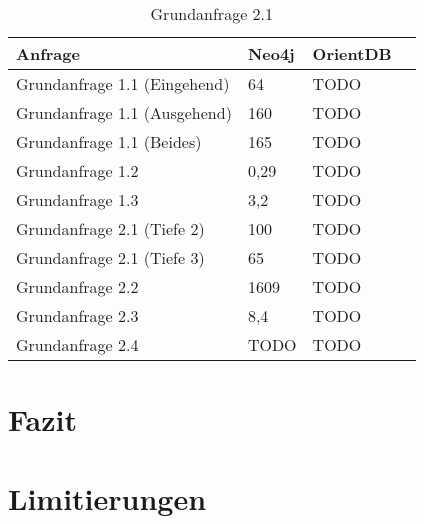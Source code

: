 \FloatBarrier
\begin{table}[h]
	\centering
	\begin{tabular}{ |p{7cm}||p{3cm}|p{3cm}|p{3cm}|  }
		\hline
		Anfrage& Neo4j & OrientDB\\
		\hline
	Grundanfrage 1.1 (Eingehend)   &  64    & TODO\\
	Grundanfrage 1.1 (Ausgehend)  & 160    & TODO\\
	Grundanfrage 1.1 (Beides)  & 165    & TODO\\
	Grundanfrage 1.2  & 0,29  & TODO   \\
	Grundanfrage 1.3  & 3,2  & TODO   \\
	Grundanfrage 2.1 (Tiefe 2)  & 100  & TODO   \\
	Grundanfrage 2.1 (Tiefe 3) & 65  & TODO   \\
	Grundanfrage 2.2  & 1609  & TODO   \\
	Grundanfrage 2.3  & 8,4  & TODO   \\
	Grundanfrage 2.4  & TODO  & TODO   \\
		\hline
	\end{tabular}
	\caption{Grundanfrage 2.1}
\end{table}
\FloatBarrier

\section{Fazit}
\section{Limitierungen}
